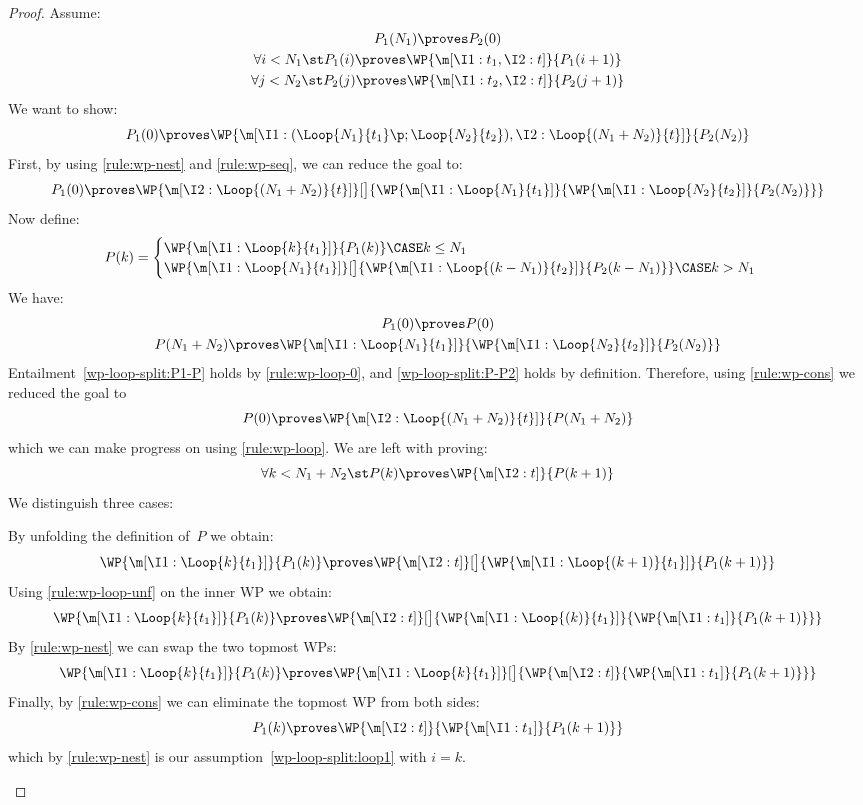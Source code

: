 \documentclass[acmsmall,nonacm,screen,appendix]{acmart}
\begin{document}
\begin{proof}
  Assume:
  \begin{gather}
  P_1(N_1) \proves P_2(0)
  \label{wp-loop-split:P1-P2}
  \\
  \forall i < N_1 \st
    P_1(i) \proves \WP{\m[\I1: t_1, \I2: t]}{P_1(i+1)}
  \label{wp-loop-split:loop1}
  \\
  \forall j < N_2 \st
    P_2(j) \proves \WP{\m[\I1: t_2, \I2: t]}{P_2(j+1)}
  \label{wp-loop-split:loop2}
  \end{gather}
  We want to show:
  \[
    P_1(0) \proves
    \WP{\m[
      \I1: (\Loop{N_1}{t_1}\p;\Loop{N_2}{t_2}),
      \I2: \Loop{(N_1+N_2)}{t}
    ]}{P_2(N_2)}
  \]
  First, by using \ref{rule:wp-nest} and \ref{rule:wp-seq},
  we can reduce the goal to:
  \[
    P_1(0) \proves
    \WP{\m[\I2: \Loop{(N_1+N_2)}{t}]}[\big]{
      \WP{\m[\I1: \Loop{N_1}{t_1}]}{
        \WP{\m[\I1:\Loop{N_2}{t_2}]}{P_2(N_2)}
       }
    }
  \]
  Now define:
  \[
    P(k) =
    \begin{cases}
    \WP {\m[\I1: \Loop{k}{t_1}]} { P_1(k) }
    \CASE k \leq N_1
    \\
    \WP {\m[\I1: \Loop{N_1}{t_1}]}[\big]{
      \WP {\m[\I1: \Loop{(k-N_1)}{t_2}]} { P_2(k-N_1) }
    }
    \CASE k > N_1
    \end{cases}
  \]
  We have:
  \begin{gather}
    P_1(0) \proves P(0)
    \label{wp-loop-split:P1-P}
    \\
    P(N_1+N_2) \proves
    \WP{\m[\I1: \Loop{N_1}{t_1}]}{
      \WP{\m[\I1:\Loop{N_2}{t_2}]}{P_2(N_2)}
     }
    \label{wp-loop-split:P-P2}
  \end{gather}
  Entailment~\eqref{wp-loop-split:P1-P} holds by \ref{rule:wp-loop-0},
  and \eqref{wp-loop-split:P-P2} holds by definition.
  Therefore, using \ref{rule:wp-cons} we reduced the goal to
  \[
    P(0) \proves \WP{\m[\I2: \Loop{(N_1+N_2)}{t}]}{P(N_1+N_2)}
  \]
  which we can make progress on using \ref{rule:wp-loop}.
  We are left with proving:
  \[
    \forall k < N_1+N_2\st
    P(k) \proves
    \WP {\m[\I2: t]} {P(k+1)}
  \]
  We distinguish three cases:
  \begin{casesplit}
  \case[$k<N_1$] By unfolding the definition of~$P$ we obtain:
    \[
      \WP {\m[\I1: \Loop{k}{t_1}]} { P_1(k) }
      \proves
      \WP {\m[\I2: t]}[\big]{
        \WP {\m[\I1: \Loop{(k+1)}{t_1}]} { P_1(k+1) }
      }
    \]
    Using \ref{rule:wp-loop-unf} on the inner WP we obtain:
    \[
      \WP {\m[\I1: \Loop{k}{t_1}]} { P_1(k) }
      \proves
      \WP {\m[\I2: t]}[\big]{
        \WP {\m[\I1: \Loop{(k)}{t_1}]} { \WP{\m[\I1: t_1]}{P_1(k+1)} }
      }
    \]
    By \ref{rule:wp-nest} we can swap the two topmost WPs:
    \[
      \WP {\m[\I1: \Loop{k}{t_1}]} { P_1(k) }
      \proves
      \WP {\m[\I1: \Loop{k}{t_1}]}[\big]{
        \WP {\m[\I2: t]} { \WP{\m[\I1: t_1]}{P_1(k+1)} }
      }
    \]
    Finally, by \ref{rule:wp-cons} we can eliminate the topmost WP from both sides:
    \[
      P_1(k)
      \proves
      \WP {\m[\I2: t]} { \WP{\m[\I1: t_1]}{P_1(k+1)} }
    \]
    which by \ref{rule:wp-nest} is our assumption~\eqref{wp-loop-split:loop1}
    with $i=k$.


\end{casesplit}
\end{proof}
\end{document}

